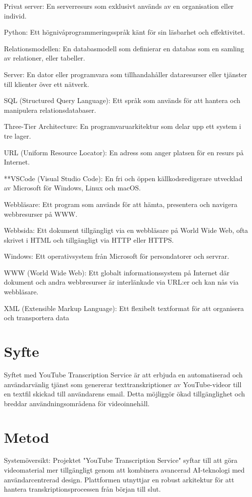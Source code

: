 Privat server: En serverresurs som exklusivt används av en organisation eller individ.

Python: Ett högnivåprogrammeringsspråk känt för sin läsbarhet och effektivitet.

Relationsmodellen: En databasmodell som definierar en databas som en samling av relationer, eller tabeller.

Server: En dator eller programvara som tillhandahåller dataresurser eller tjänster till klienter över ett nätverk.

SQL (Structured Query Language): Ett språk som används för att hantera och manipulera relationsdatabaser.

Three-Tier Architecture: En programvaruarkitektur som delar upp ett system i tre lager.

URL (Uniform Resource Locator): En adress som anger platsen för en resurs på Internet.

**VSCode (Visual Studio Code): En fri och öppen källkodsredigerare utvecklad av Microsoft för Windows, Linux och macOS.

Webbläsare: Ett program som används för att hämta, presentera och navigera webbresurser på WWW.

Webbsida: Ett dokument tillgängligt via en webbläsare på World Wide Web, ofta skrivet i HTML och tillgängligt via HTTP eller HTTPS.

Windows: Ett operativsystem från Microsoft för persondatorer och servrar.

WWW (World Wide Web): Ett globalt informationssystem på Internet där dokument och andra webbresurser är interlänkade via URL:er och kan nås via webbläsare.

XML (Extensible Markup Language): Ett flexibelt textformat för att organisera och transportera data

\section{Syfte}
Syftet med YouTube Transcription Service är att erbjuda en automatiserad och användarvänlig tjänst som genererar texttranskriptioner av YouTube-videor till en textfil skickad till användarens email. Detta möjliggör ökad tillgänglighet och breddar användningsområdena för videoinnehåll.

\section{Metod}
Systemöversikt:
Projektet "YouTube Transcription Service" syftar till att göra videomaterial mer tillgängligt genom att kombinera avancerad AI-teknologi med användarcentrerad design. Plattformen utnyttjar en robust arkitektur för att hantera transkriptionsprocessen från början till slut.


